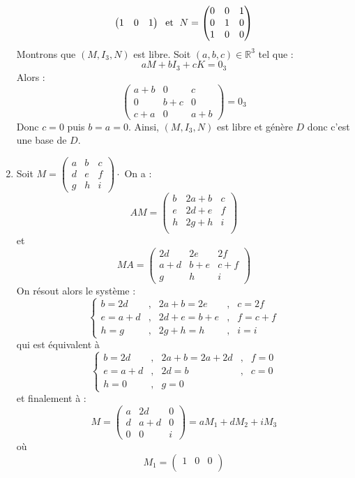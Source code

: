 \documentclass[a4paper,twoside,french,11pt]{VcCours}
\begin{document}
\begin{enumerate}
$$\begin{pmatrix}
1 & 0 & 1
\end{pmatrix} \; \hbox{ et } \; N = \begin{pmatrix}
0 & 0 & 1 \\
0 & 1 & 0 \\
1 & 0 & 0 
\end{pmatrix}$$
Montrons que $(M,I_3,N)$ est libre. Soit $(a,b,c) \in \mathbb{R}^3$ tel que :
$$ a M + b I_3 + c K = 0_3$$
Alors :
$$ \begin{pmatrix}
a+b & 0 & c \\
0 & b+c & 0 \\
c+a & 0& a+b 
\end{pmatrix} = 0_3 $$
Donc $c=0$ puis $b=a=0$. Ainsi, $(M,I_3,N)$ est libre et génère $D$ donc c'est une base de $D$.
\item Soit $M = \begin{pmatrix}
a & b & c \\
d & e & f \\
g & h & i 
\end{pmatrix} \cdot$ On a :
$$ AM = \begin{pmatrix}
b & 2a+b & c\\
e & 2d+e & f \\
h & 2g+h & i \\
\end{pmatrix}$$
et
$$ MA  =\begin{pmatrix}
2d& 2e& 2f \\
a+d & b+e & c+f \\
g & h & i 
\end{pmatrix}$$
On résout alors le système :
$$ \left\lbrace \begin{array}{lclcl}
b= 2d &,& 2a+b=2e &,& c=2f\\
e=a+d &,& 2d+e=b+e &,& f=c+f \\
h=g &,& 2g+h=h&,& i=i
\end{array}\right.$$
qui est équivalent à 
$$ \left\lbrace \begin{array}{lclcl}
b= 2d &,& 2a+b=2a+2d &,& f=0\\
e=a+d &,& 2d=b &,& c=0 \\
h=0 &,& g=0&& 
\end{array}\right.$$
et finalement à :
$$ M = \begin{pmatrix}
a & 2d & 0 \\
d & a+d & 0 \\
0 & 0 & i
\end{pmatrix} = a M_1+ d M_2+i M_3$$
où 
$$ M_1 = \begin{pmatrix}
1 & 0 & 0 \\

\end{pmatrix}$$
\end{enumerate}
\end{document}

